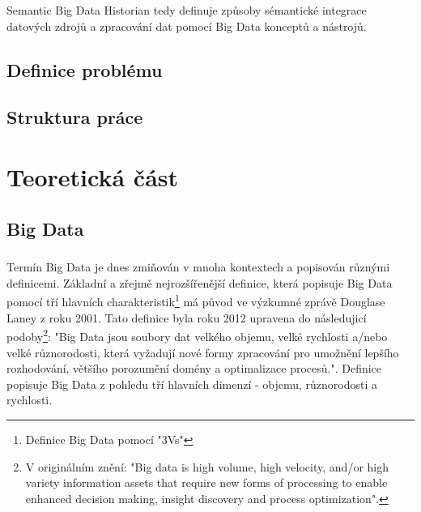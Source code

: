 \documentclass[11pt,twoside,a4paper]{book}
\begin{document}
		Semantic Big Data Historian tedy definuje způsoby sémantické integrace datových zdrojů a zpracování dat pomocí Big Data konceptů a nástrojů. 

	\section{Definice problému} \label{sec:def}

	\section{Struktura práce} 
		
		
\chapter{Teoretická část}
	\section{Big Data}
		\paragraph{}
		Termín Big Data je dnes zmiňován v mnoha kontextech a popisován různými definicemi. Základní a zřejmě nejrozšířenější definice, která popisuje Big Data pomocí tří hlavních charakteristik\footnote{Definice Big Data pomocí "3Vs"} má původ ve výzkumné zprávě Douglase Laney \cite{Laney01} z roku 2001. Tato definice byla roku 2012 upravena do následujicí podoby\footnote{V originálním znění: "Big data is high volume, high velocity, and/or high variety information assets that require new forms of processing to enable enhanced decision making, insight discovery and process optimization".}: "Big Data jsou soubory dat velkého objemu, velké rychlosti a/nebo velké různorodosti, která vyžadují nové formy zpracování pro umožnění lepšího rozhodování, většího porozumění domény a optimalizace procesů.". Definice popisuje Big Data z pohledu tří hlavních dimenzí - objemu, různorodosti a rychlosti.  
		
\end{document}
